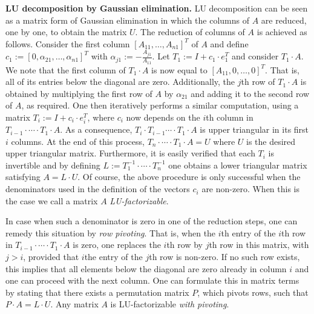 \smallskip
\noindent
\textbf{LU decomposition by Gaussian elimination.} LU decomposition can be seen as a matrix form of Gaussian elimination in which the columns of $A$
are reduced, one by one, to obtain the matrix $U$. The reduction of columns of $A$ is achieved
as follows. Consider the first column $[A_{11},\ldots,A_{n1}]^T$ of $A$ and  define 
$c_1 := [0, \alpha_{21},\ldots, \alpha_{n1}]^T$ 
with $\alpha_{j1} := -\frac{A_{j1}}{A_{11}}$. Let $T_1:=I+ c_1\cdot e_1^T$ and consider
$T_1\cdot A$. We note that the first column of $T_1\cdot A$ is now equal to $[A_{11},0,\ldots,0]^T$. That is,
all of its entries below the diagonal are zero. Additionally, the $j$th row of $T_1\cdot A$ is obtained by multiplying the first row of $A$ by $\alpha_{21}$ and adding it to the second row of $A$, as required. One then iteratively performs a similar computation, using a matrix $T_i:=I+c_i\cdot e_i^T$, where $c_i$ now depends on the $i$th column in $T_{i-1}\cdot\cdots\cdot T_1\cdot A$. As a consequence, $T_i\cdot T_{i-1}\cdots \cdot T_1\cdot A$ is upper triangular
in its first $i$ columns. At the end of this process, $T_n\cdot\cdots\cdot T_1\cdot A=U$ where $U$ is the desired upper triangular matrix.
Furthermore, it is easily verified that each $T_i$ is invertible and by defining $L:=T_1^{-1}\cdot\cdots\cdot T_n^{-1}$ one obtains a lower triangular matrix satisfying $A=L\cdot U$. Of course, the above procedure is only successful when the denominators used in the definition of the vectors $c_i$ are non-zero. When this is the case we call a matrix $A$ \textit{LU-factorizable}. 

In case when such a denominator is zero in one of the reduction steps, one can remedy this situation by \textit{row pivoting}. That is, when the $i$th entry of the
$i$th row in $T_{i-1}\cdot\cdots\cdot T_1\cdot A$ is zero, one replaces the $i$th row by  $j$th row in this matrix, with $j>i$, provided that $i$the entry of the $j$th row is non-zero. If no such row exists, this implies that all elements below the diagonal are zero already in column $i$ and one can proceed with the next column. One can formulate this in matrix terms by stating that there exists a permutation matrix $P$, which pivots rows, such that $P\cdot A=L\cdot U$. Any matrix $A$ is LU-factorizable \textit{with pivoting}.
 
